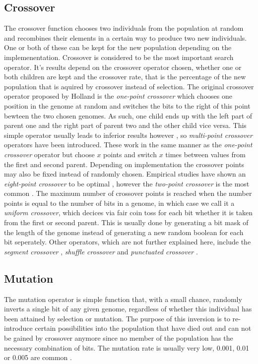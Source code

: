\subsection{Crossover}
\label{sec:crossover}

The crossover function chooses two individuals from the population at random and recombines their elements in a certain way to produce two new individuals. One or both of these can be kept for the new population depending on the implemenentation. Crossover is considered to be the most important search operator\cite{16}. It's results depend on the crossover operator chosen, whether one or both children are kept and the crossover rate, that is the percentage of the new population that is aquired by crossover instead of selection. The original crossover operator proposed by Holland is the \textit{one-point crossover} which chooses one position in the genome at random and switches the bits to the right of this point bewteen the two chosen genomes. As such, one child ends up with the left part of parent one and the right part of parent two and the other child vice versa. This simple operator usually leads to inferior results however \cite{18,19,20}, so \textit{multi-point crossover} operators have been introduced. These work in the same manner as the \textit{one-point crossover} operator but choose $x$ points and switch $x$ times between values from the first and second parent. Depending on implementation the crossover points may also be fixed instead of randomly chosen. Empirical studies have shown an \textit{eight-point crossover} to be optimal \cite{21,22,19}, however the \textit{two-point crossover}  is the most common \cite{19}. The maximum number of crossover points is reached when the number points is equal to the number of bits in a genome, in which case we call it a \textit{uniform crossover}, which decices via fair coin toss for each bit whether it is taken from the first or second parent. This is usually done by generating a bit mask of the length of the genome instead of generating a new random boolean for each bit seperately. Other operators, which are not further explained here, include the \textit{segment crossover} \cite{19}, \textit{shuffle crossover} \cite{19} and \textit{punctuated crossover} \cite{23}.

\subsection{Mutation}
\label{sec:mutation}

The mutation operator is simple function that, with a small chance, randomly inverts a single bit of any given genome, regardless of whether this individual has been attained by selection or mutation. The purpose of this inversion is to re-introduce certain possibilities into the population that have died out and can not be gained by crossover anymore since no member of the population has the necessary combination of bits. The mutation rate is usually very low, 0.001, 0.01 or 0.005 are common \cite{20,23,24}.

